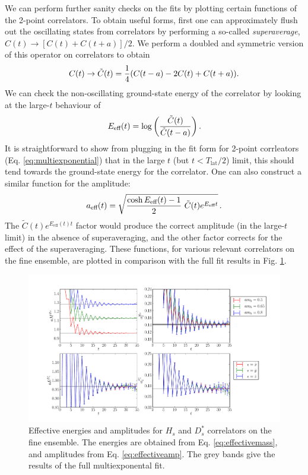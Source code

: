 We can perform further sanity checks on the fits by plotting certain functions of the 2-point correlators. To obtain useful forms, first one can approximately flush out the oscillating states from correlators by performing a so-called {\it{superaverage}}, $C(t) \to [ C(t) + C(t+a) ]/2$. We perform a doubled and symmetric version of this operator on correlators to obtain
\begin{align}
  C(t) \to \tilde{C}(t) = {1\over 4}( C(t-a) - 2C(t) + C(t+a) ).
  \label{eq:superav2}
\end{align}
We can check the non-oscillating ground-state energy of the correlator by looking at the large-$t$ behaviour of
\begin{align}
  E_{\text{eff}}(t) = \log\left({ \tilde{C}(t)\over \tilde{C}(t-a) }\right).
  \label{eq:effectivemass}
\end{align}
It is straightforward to show from plugging in the fit form for 2-point corrleators (Eq. \eqref{eq:multiexponential}) that in the large $t$ (but $t < T_{\text{lat}}/2$) limit, this should tend towards the ground-state energy for the correlator. One can also construct a similar function for the amplitude:
\begin{align}
  a_{\text{eff}}(t) = \sqrt{{\cosh E_{\text{eff}}(t)-1\over 2} \,\,\tilde{C}(t) e^{E_{\text{eff}}t} }\,.
  \label{eq:effectiveamp}
\end{align}
The $\tilde{C}(t)e^{E_{\text{eff}}(t)t}$ factor would produce the correct amplitude (in the large-$t$ limit) in the absence of superaveraging, and the other factor corrects for the effect of the superaveraging. These functions, for various relevant correlators on the fine ensemble, are plotted in comparison with the full fit results in Fig. \ref{fig:2pt-summary_BsDsstar}.

\begin{figure}[htb!]
  \begin{center}
  \includegraphics[width=1.1\textwidth]{images/BsDsstar/2ptsummary_fine.pdf}
  \caption{Effective energies and amplitudes for $H_s$ and $D_s^*$ correlators on the fine ensemble. The energies are obtained from Eq. \eqref{eq:effectivemass}, and amplitudes from Eq. \eqref{eq:effectiveamp}. The grey bands give the results of the full multiexponental fit. \label{fig:2pt-summary_BsDsstar}}
  \end{center}
\end{figure}


